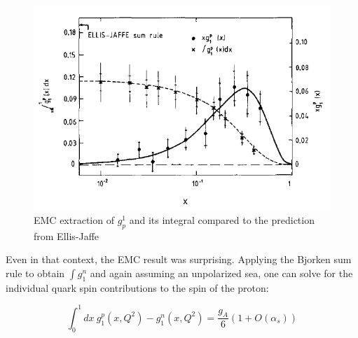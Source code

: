 \begin{figure}
  \includegraphics[width=1.0\textwidth]{figures/emc-g1p}
  \caption{EMC extraction of $g^1_p$ and its integral compared to the prediction from Ellis-Jaffe \cite{Ashman:1987hv}}
  \label{fig:emc-g1p}
\end{figure}

Even in that context, the EMC result was surprising. Applying the Bjorken sum
rule to obtain $\int g_1^n$ and again assuming an unpolarized sea, one can
solve for the individual quark spin contributions to the spin of the proton:

\begin{equation}
  \int_0^1 dx~g_1^p(x,Q^2) - g_1^n(x,Q^2) = \frac{g_A}{6}(1 + O(\alpha_s))
\end{equation}

% 
% 
% 
% 
% 
% 
% 
% 
